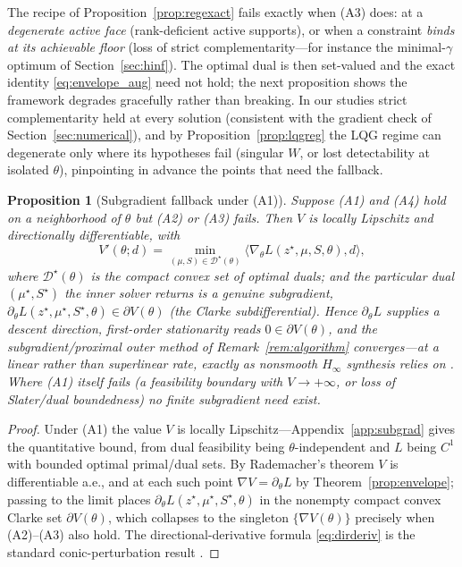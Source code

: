 \documentclass[twocolumn,amsthm]{autart}
\newtheorem{proposition}{Proposition}
\begin{document}
\begin{rem}\label{rem:exactfail}
The recipe of Proposition~\ref{prop:regexact} fails exactly when (A3) does: at a
\emph{degenerate active face} (rank-deficient active supports), or when a constraint
\emph{binds at its achievable floor} (loss of strict complementarity---for instance
the minimal-$\gamma$ optimum of Section~\ref{sec:hinf}). The optimal dual is then
set-valued and the exact identity \eqref{eq:envelope_aug} need not hold; the next
proposition shows the framework degrades gracefully rather than breaking. In our
studies strict complementarity held at every solution (consistent with the gradient
check of Section~\ref{sec:numerical}), and by Proposition~\ref{prop:lqgreg} the LQG
regime can degenerate only where its hypotheses fail (singular $W$, or lost
detectability at isolated $\theta$), pinpointing in advance the points that need the
fallback.
\end{rem}

\begin{proposition}[Subgradient fallback under (A1)]\label{prop:subgrad}
Suppose (A1) and (A4) hold on a neighborhood of $\theta$ but (A2) or (A3) fails.
Then $V$ is locally Lipschitz and directionally differentiable, with
\begin{equation}\label{eq:dirderiv}
V'(\theta;d)=\min_{(\mu,S)\in\mathcal{D}^\star(\theta)}
\langle\nabla_\theta L(z^\star,\mu,S,\theta),d\rangle,
\end{equation}
where $\mathcal{D}^\star(\theta)$ is the compact convex set of optimal duals; and the
particular dual $(\mu^\star,S^\star)$ the inner solver returns is a genuine
subgradient, $\partial_\theta L(z^\star,\mu^\star,S^\star,\theta)\in\partial V(\theta)$
(the Clarke subdifferential). Hence $\partial_\theta L$ supplies a descent direction,
first-order stationarity reads $0\in\partial V(\theta)$, and the subgradient/proximal
outer method of Remark~\ref{rem:algorithm} converges---at a linear rather than
superlinear rate, exactly as nonsmooth $H_\infty$ synthesis relies on
\cite{bonnans2000perturbation}. Where (A1) itself fails (a feasibility boundary with
$V\to+\infty$, or loss of Slater/dual boundedness) no finite subgradient need exist.
\end{proposition}
\begin{proof}
Under (A1) the value $V$ is locally Lipschitz---Appendix~\ref{app:subgrad} gives the
quantitative bound, from dual feasibility being $\theta$-independent and $L$ being
$C^1$ with bounded optimal primal/dual sets. By Rademacher's theorem $V$ is
differentiable a.e., and at each such point $\nabla V=\partial_\theta L$ by
Theorem~\ref{prop:envelope}; passing to the limit places
$\partial_\theta L(z^\star,\mu^\star,S^\star,\theta)$ in the nonempty compact convex
Clarke set $\partial V(\theta)$, which collapses to the singleton
$\{\nabla V(\theta)\}$ precisely when (A2)--(A3) also hold. The directional-derivative
formula \eqref{eq:dirderiv} is the standard conic-perturbation result
\cite{bonnans2000perturbation}.
\end{proof}
\end{document}
